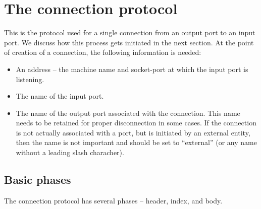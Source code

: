 
\chapter{The connection protocol}

This is the protocol used for a single connection from
an output port to an input port.  We discuss how this
process gets initiated in the next section.
At the point of creation of a connection, the
following information is needed:

\begin{itemize}

\item An address -- the machine name and socket-port at which
the input port is listening.

\item The name of the input port.

\item The name of the output port associated with the
connection.  This name
needs to be retained for proper disconnection in some cases.
If the connection is not actually associated with a port,
but is initiated by an external entity, then the name is
not important and should be set to ``external'' (or any
name without a leading slash characher).

\end{itemize}

\section{Basic phases}

The connection protocol has several phases -- header,
index, and body.

